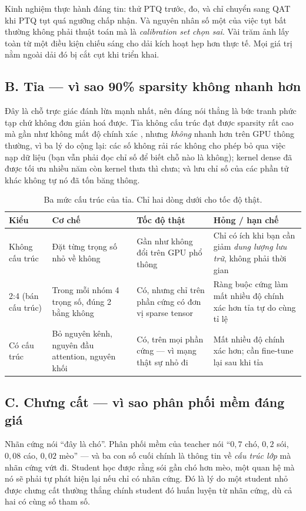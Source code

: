\documentclass[../../deep_learning.tex]{subfiles}
\begin{document}
Kinh nghiệm thực hành đáng tin: thử PTQ trước, đo, và chỉ chuyển sang QAT khi PTQ tụt quá ngưỡng chấp nhận. Và nguyên nhân số một của việc tụt bất thường không phải thuật toán mà là \emph{calibration set chọn sai}. Vài trăm ảnh lấy toàn từ một điều kiện chiếu sáng cho dải kích hoạt hẹp hơn thực tế. Mọi giá trị nằm ngoài dải đó bị cắt cụt khi triển khai.

\subsection{B. Tỉa --- vì sao 90\% sparsity không nhanh hơn}
Đây là chỗ trực giác đánh lừa mạnh nhất, nên đáng nói thẳng là bức tranh phức tạp chứ không đơn giản hoá được. Tỉa không cấu trúc đạt được sparsity rất cao mà gần như không mất độ chính xác \cite{han2016deep,frankle2019lottery}, nhưng \emph{không} nhanh hơn trên GPU thông thường, vì ba lý do cộng lại: các số không rải rác không cho phép bỏ qua việc nạp dữ liệu (bạn vẫn phải đọc chỉ số để biết chỗ nào là không); kernel dense đã được tối ưu nhiều năm còn kernel thưa thì chưa; và lưu chỉ số của các phần tử khác không tự nó đã tốn băng thông.

\begin{table}[H]\centering\footnotesize
\caption{Ba mức cấu trúc của tỉa. Chỉ hai dòng dưới cho tốc độ thật.}
\label{tab:pruning}
\begin{tabularx}{\linewidth}{@{}L{2.5cm}YYY@{}}
\toprule
\textbf{Kiểu} & \textbf{Cơ chế} & \textbf{Tốc độ thật} & \textbf{Hỏng / hạn chế}\\
\midrule
Không cấu trúc & Đặt từng trọng số nhỏ về không & Gần như không đổi trên GPU phổ thông & Chỉ có ích khi bạn cần giảm \emph{dung lượng lưu trữ}, không phải thời gian\\
2:4 (bán cấu trúc) & Trong mỗi nhóm 4 trọng số, đúng 2 bằng không & Có, nhưng chỉ trên phần cứng có đơn vị sparse tensor & Ràng buộc cứng làm mất nhiều độ chính xác hơn tỉa tự do cùng tỉ lệ\\
Có cấu trúc & Bỏ nguyên kênh, nguyên đầu attention, nguyên khối & Có, trên mọi phần cứng --- vì mạng thật sự nhỏ đi & Mất nhiều độ chính xác hơn; cần fine-tune lại sau khi tỉa\\
\bottomrule
\end{tabularx}
\end{table}

\subsection{C. Chưng cất --- vì sao phân phối mềm đáng giá}
Nhãn cứng nói ``đây là chó''. Phân phối mềm của teacher nói ``$0{,}7$ chó, $0{,}2$ sói, $0{,}08$ cáo, $0{,}02$ mèo'' --- và ba con số cuối chính là thông tin về \emph{cấu trúc lớp} mà nhãn cứng vứt đi. Student học được rằng sói gần chó hơn mèo, một quan hệ mà nó sẽ phải tự phát hiện lại nếu chỉ có nhãn cứng. Đó là lý do một student nhỏ được chưng cất thường thắng chính student đó huấn luyện từ nhãn cứng, dù cả hai có cùng số tham số.
\end{document}
